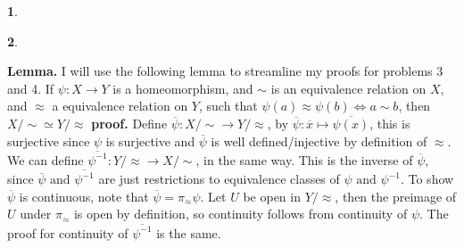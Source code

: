 \documentclass[10.5pt]{article}
\theoremstyle{definition}
\newtheorem{pb}{}
\newcommand{\tand}{\text{ and }}
\newcommand{\ism}{\simeq}
\begin{document}
    \begin{pb}
        
    \end{pb}
    \begin{pb}
        
    \end{pb}

    \textbf{Lemma.} I will use the following lemma to streamline my proofs for problems 3 and 4. \newline
    If \(\psi: X \to Y\) is a homeomorphism, and \(\sim\) is an equivalence relation on \(X\), and \(\approx\) a equivalence relation on \(Y\), such that
    \(\psi(a) \approx \psi(b) \iff a \sim b\), then \(X/\sim \ism Y/\approx\) \newline
    \textbf{proof.} Define \(\overline{\psi}: X/\sim \to Y/\approx\), by \(\overline{\psi}: \overline{x} \mapsto \overline{\psi(x)}\), this is surjective since \(\psi\) is surjective and \(\overline{\psi}\) is
    well defined/injective by definition of \(\approx\). We can define \(\overline{\psi^{-1}}: Y/\approx \to X/\sim\), in the same way. This is the inverse of \(\overline{\psi}\), since
    \(\overline{\psi} \tand \overline{\psi^{-1}}\) are just restrictions to equivalence classes of \(\psi \tand \psi^{-1}\). To show \(\overline{\psi}\) is continuous, note that
    \(\overline{\psi} = \pi_\approx \psi\). Let \(U\) be open in \(Y/\approx\), then the preimage of \(U\) under \(\pi_\approx \) is open by definition, so continuity follows from continuity of \(\psi\).
    The proof for continuity of \(\overline{\psi^{-1}}\) is the same.
\end{document}
